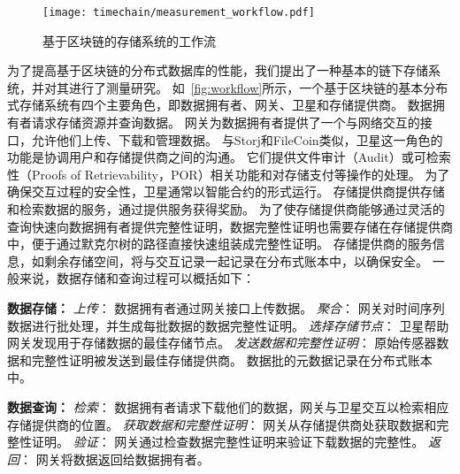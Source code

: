 \begin{figure}[t]
    \centering
    \texttt{[image: timechain/measurement\_workflow.pdf]}
    \caption{基于区块链的存储系统的工作流}
    \label{fig:workflow}
\end{figure}

为了提高基于区块链的分布式数据库的性能，我们提出了一种基本的链下存储系统，并对其进行了测量研究。
如~\autoref{fig:workflow}所示，一个基于区块链的基本分布式存储系统有四个主要角色，即数据拥有者、网关、卫星和存储提供商。
数据拥有者请求存储资源并查询数据。
网关为数据拥有者提供了一个与网络交互的接口，允许他们上传、下载和管理数据。
与Storj和FileCoin类似，卫星这一角色的功能是协调用户和存储提供商之间的沟通。
它们提供文件审计（Audit）或可检索性（Proofs of Retrievability，POR）相关功能和对存储支付等操作的处理。
为了确保交互过程的安全性，卫星通常以智能合约的形式运行。
存储提供商提供存储和检索数据的服务，通过提供服务获得奖励。
为了使存储提供商能够通过灵活的查询快速向数据拥有者提供完整性证明，数据完整性证明也需要存储在存储提供商中，便于通过默克尔树的路径直接快速组装成完整性证明。
存储提供商的服务信息，如剩余存储空间，将与交互记录一起记录在分布式账本中，以确保安全。
一般来说，数据存储和查询过程可以概括如下：

\textbf{数据存储：}
\textit{上传}：
数据拥有者通过网关接口上传数据。
\textit{聚合}：
网关对时间序列数据进行批处理，并生成每批数据的数据完整性证明。
\textit{选择存储节点}：
卫星帮助网关发现用于存储数据的最佳存储节点。
\textit{发送数据和完整性证明}：
原始传感器数据和完整性证明被发送到最佳存储提供商。
数据批的元数据记录在分布式账本中。

\textbf{数据查询：}
\textit{检索}：
数据拥有者请求下载他们的数据，网关与卫星交互以检索相应存储提供商的位置。
\textit{获取数据和完整性证明}：
网关从存储提供商处获取数据和完整性证明。
\textit{验证}：
网关通过检查数据完整性证明来验证下载数据的完整性。
\textit{返回}：
网关将数据返回给数据拥有者。

